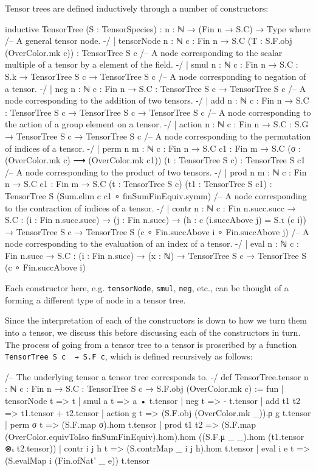 \documentclass[a4paper, 11pt]{article}
\DeclareRobustCommand{\myinline}{\lstinline}
\begin{document}
Tensor trees are defined inductively through a number of constructors: 
\begin{codeLong}
inductive TensorTree (S : TensorSpecies) : {n : ℕ} → (Fin n → S.C) → Type where
  /-- A general tensor node. -/
  | tensorNode {n : ℕ} {c : Fin n → S.C} (T : S.F.obj (OverColor.mk c)) : TensorTree S c
  /-- A node corresponding to the scalar multiple of a tensor by a element of the field. -/
  | smul {n : ℕ} {c : Fin n → S.C} : S.k → TensorTree S c → TensorTree S c
  /-- A node corresponding to negation of a tensor. -/
  | neg {n : ℕ} {c : Fin n → S.C} : TensorTree S c → TensorTree S c
  /-- A node corresponding to the addition of two tensors. -/
  | add {n : ℕ} {c : Fin n → S.C} : TensorTree S c → TensorTree S c → TensorTree S c
  /-- A node corresponding to the action of a group element on a tensor. -/
  | action {n : ℕ} {c : Fin n → S.C} : S.G → TensorTree S c → TensorTree S c
  /-- A node corresponding to the permutation of indices of a tensor. -/
  | perm {n m : ℕ} {c : Fin n → S.C} {c1 : Fin m → S.C}
      (σ : (OverColor.mk c) ⟶ (OverColor.mk c1)) (t : TensorTree S c) : TensorTree S c1
  /-- A node corresponding to the product of two tensors. -/
  | prod {n m : ℕ} {c : Fin n → S.C} {c1 : Fin m → S.C}
    (t : TensorTree S c) (t1 : TensorTree S c1) : TensorTree S (Sum.elim c c1 ∘ finSumFinEquiv.symm)
  /-- A node corresponding to the contraction of indices of a tensor. -/
  | contr {n : ℕ} {c : Fin n.succ.succ → S.C} : (i : Fin n.succ.succ) →
    (j : Fin n.succ) → (h : c (i.succAbove j) = S.τ (c i)) → TensorTree S c →
    TensorTree S (c ∘ Fin.succAbove i ∘ Fin.succAbove j)
  /-- A node corresponding to the evaluation of an index of a tensor. -/
  | eval {n : ℕ} {c : Fin n.succ → S.C} : (i : Fin n.succ) → (x : ℕ) → TensorTree S c →
    TensorTree S (c ∘ Fin.succAbove i)
\end{codeLong}
Each constructor here, e.g. \myinline|tensorNode|, \myinline|smul|, \myinline|neg|, etc., can 
be thought of a forming a different type of node in a tensor tree.

Since the interpretation of each of the constructors is down to how we turn them into a tensor,
we discuss this before discussing each of the constructors in turn. The process 
of going from a tensor tree to a tensor is proscribed by a function
\myinline|TensorTree S c  → S.F c|, which is defined recursively as follows: 
\begin{code}
/-- The underlying tensor a tensor tree corresponds to. -/
def TensorTree.tensor {n : ℕ} {c : Fin n → S.C} : TensorTree S c → S.F.obj (OverColor.mk c) := fun
  | tensorNode t => t
  | smul a t => a • t.tensor
  | neg t => - t.tensor
  | add t1 t2 => t1.tensor + t2.tensor
  | action g t => (S.F.obj (OverColor.mk _)).ρ g t.tensor
  | perm σ t => (S.F.map σ).hom t.tensor
  | prod t1 t2 => (S.F.map (OverColor.equivToIso finSumFinEquiv).hom).hom
    ((S.F.μ _ _).hom (t1.tensor ⊗ₜ t2.tensor))
  | contr i j h t => (S.contrMap _ i j h).hom t.tensor
  | eval i e t => (S.evalMap i (Fin.ofNat' _ e)) t.tensor
\end{code}
\end{document}
